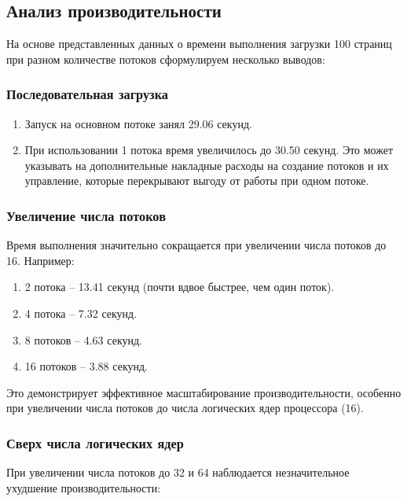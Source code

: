 \subsection*{Анализ производительности}

\hspace{1.25cm}
На основе представленных данных о времени выполнения загрузки 100 страниц при разном количестве потоков сформулируем несколько выводов:

\subsubsection*{Последовательная загрузка}

\begin{enumerate}
    \item Запуск на основном потоке занял 29.06 секунд.
    \item При использовании 1 потока время увеличилось до 30.50 секунд. Это может указывать на дополнительные накладные расходы на создание потоков и их управление, которые перекрывают выгоду от работы при одном потоке.
\end{enumerate}

\subsubsection*{Увеличение числа потоков}

\hspace{1.25cm}
Время выполнения значительно сокращается при увеличении числа потоков до 16. Например:

\begin{enumerate}
    \item 2 потока – 13.41 секунд (почти вдвое быстрее, чем один поток).
    \item 4 потока – 7.32 секунд.
    \item 8 потоков – 4.63 секунд.
    \item 16 потоков – 3.88 секунд.
\end{enumerate}

Это демонстрирует эффективное масштабирование производительности, особенно при увеличении числа потоков до числа логических ядер процессора (16).

\subsubsection*{Сверх числа логических ядер}

\hspace{1.25cm}
При увеличении числа потоков до 32 и 64 наблюдается незначительное ухудшение производительности:

